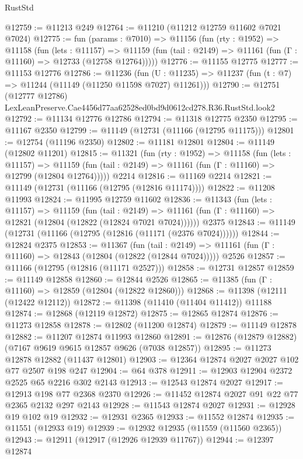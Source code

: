 \begin{lexlean}{RustStd}
\begin{coremodule}
@12759 := @11213 @249
@12764 := @11210 (@11212 @12759 @11602 @7021 @7024)
@12775 := fun (params : @7010) =>
  @11156
    (fun (rty : @1952) =>
    @11158
      (fun (lets : @11157) =>
      @11159 (fun (tail : @2149) => @11161 (fun (Γ : @11160) => @12733 (@12758 @12764)))))
@12776 := @11155 @12775
@12777 := @11153 @12776
@12786 := @11236
    (fun (U : @11235) => @11237 (fun (t : @7) => @11244 (@11149 (@11250 @11598 @7027) @11261)))
@12790 := @12751 (@12777 @12786) LexLeanPreserve.Cae4456d77aa62528ed0bd9d0612cd278.R36.RustStd.look2
@12792 := @11134 @12776 @12786
@12794 := @11318 @12775 @2350
@12795 := @11167 @2350
@12799 := @11149 (@12731 (@11166 (@12795 @11175)))
@12801 := @12754 (@11196 @2350)
@12802 := @11181 @12801
@12804 := @11149 (@12802 @11201)
@12815 := @11321
    (fun (rty : @1952) =>
    @11158
      (fun (lets : @11157) =>
      @11159 (fun (tail : @2149) => @11161 (fun (Γ : @11160) => @12799 (@12804 @12764)))))
    @2214
@12816 := @11169 @2214
@12821 := @11149 (@12731 (@11166 (@12795 (@12816 @11174))))
@12822 := @11208 @11993
@12824 := @11995 @12759 @11602
@12836 := @11343
    (fun (lets : @11157) =>
    @11159
      (fun (tail : @2149) =>
      @11161 (fun (Γ : @11160) => @12821 (@12804 (@12822 (@12824 @7021 @7024))))))
    @2375
@12843 := @11149 (@12731 (@11166 (@12795 (@12816 (@11171 (@2376 @7024))))))
@12844 := @12824 @2375
@12853 := @11367
    (fun (tail : @2149) => @11161 (fun (Γ : @11160) => @12843 (@12804 (@12822 (@12844 @7024)))))
    @2526
@12857 := @11166 (@12795 (@12816 (@11171 @2527)))
@12858 := @12731 @12857
@12859 := @11149 @12858
@12860 := @12844 @2526
@12865 := @11385 (fun (Γ : @11160) => @12859 (@12804 (@12822 @12860)))
@12868 := @11398 (@12111 (@12422 @12112))
@12872 := @11398 (@11410 (@11404 @11412)) @11188
@12874 := @12868 (@12119 @12872)
@12875 := @12865 @12874
@12876 := @11273 @12858
@12878 := @12802 (@11200 @12874)
@12879 := @11149 @12878
@12882 := @11207 @12874 @11993 @12860
@12891 := @12876 (@12879 @12882) (@7167 @9619 @9615 @12857 @9626 (@7038 @12857))
@12895 := @11273 @12878 @12882 (@11437 @12801)
@12903 := @12364 @12874 @2027 @2027 @102 @77 @2507 @198 @247
@12904 := @64 @378
@12911 := @12903 @12904 @2372 @2525 @65 @2216 @302 @2143
@12913 := @12543 @12874 @2027
@12917 := @12913 @198 @77 @2368 @2370
@12926 := @11452 @12874 @2027 @91 @22 @77 @2365 @2132 @297 @2143
@12928 := @11543 @12874 @2027
@12931 := @12928 @19 @102 @19
@12932 := @12931 @2365
@12933 := @11552 @12874
@12935 := @11551 (@12933 @19)
@12939 := @12932 @12935 (@11559 (@11560 @2365))
@12943 := @12911 (@12917 (@12926 @12939 @11767))
@12944 := @12397 @12874

\end{coremodule}
\end{lexlean}
